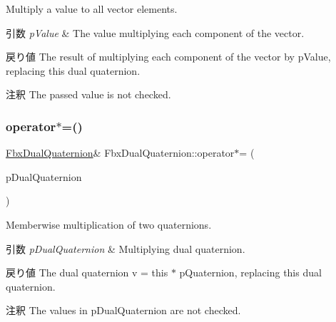 Multiply a value to all vector elements. 
\begin{DoxyParams}{引数}
{\em p\+Value} & The value multiplying each component of the vector. \\
\hline
\end{DoxyParams}
\begin{DoxyReturn}{戻り値}
The result of multiplying each component of the vector by p\+Value, replacing this dual quaternion. 
\end{DoxyReturn}
\begin{DoxyRemark}{注釈}
The passed value is not checked. 
\end{DoxyRemark}
\mbox{\label{class_fbx_dual_quaternion_ad111738104db31db04967420eea645a0}} 
\subsubsection{\texorpdfstring{operator$\ast$=()}{operator*=()}\hspace{0.1cm}{\footnotesize\ttfamily [2/2]}}
{\footnotesize\ttfamily \hyperlink{class_fbx_dual_quaternion}{Fbx\+Dual\+Quaternion}\& Fbx\+Dual\+Quaternion\+::operator$\ast$= (\begin{DoxyParamCaption}\item[{const \hyperlink{class_fbx_dual_quaternion}{Fbx\+Dual\+Quaternion} \&}]{p\+Dual\+Quaternion }\end{DoxyParamCaption})}

Memberwise multiplication of two quaternions. 
\begin{DoxyParams}{引数}
{\em p\+Dual\+Quaternion} & Multiplying dual quaternion. \\
\hline
\end{DoxyParams}
\begin{DoxyReturn}{戻り値}
The dual quaternion v\textquotesingle{} = this $\ast$ p\+Quaternion, replacing this dual quaternion. 
\end{DoxyReturn}
\begin{DoxyRemark}{注釈}
The values in p\+Dual\+Quaternion are not checked. 
\end{DoxyRemark}
\mbox{\label{class_fbx_dual_quaternion_a0c49437e36f15a2c405e3f055ca615c4}} 
